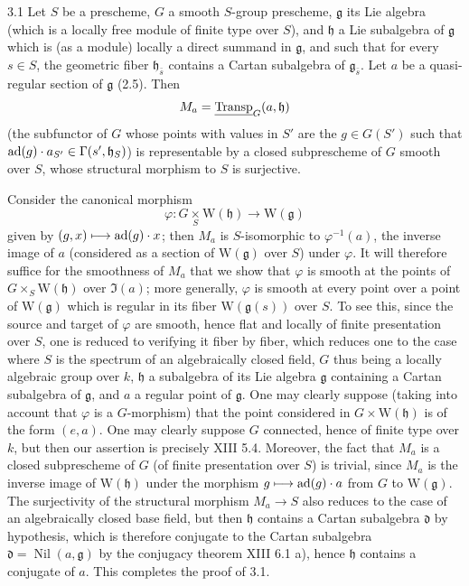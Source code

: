 \begin{theorem}{3.1}\label{XIV.3.1}
Let $S$ be a prescheme, $G$ a smooth
$S$-group prescheme, $\mathfrak g$ its
Lie algebra (which is a locally free
module of finite type over $S$), and
$\mathfrak h$ a Lie subalgebra of
$\mathfrak g$ which is (as a module)
locally a direct summand in
$\mathfrak g$, and such that for every
$s\in S$, the geometric fiber
$\mathfrak h_{\bar s}$ contains a
Cartan subalgebra of $\mathfrak g_{\bar s}$.
Let $a$ be a quasi-regular section of
$\mathfrak g$ (2.5). Then
\[
 M_a=\underline{\operatorname{Transp}}_G(a,\mathfrak h)
\]
(the subfunctor of $G$ whose points
with values in $S'$ are the
$g\in G(S')$ such that
$\operatorname{ad}(g)\cdot a_{S'}\in\Gamma(s',\mathfrak h_S)$)
is representable by a closed subprescheme
of $G$ smooth over $S$, whose structural
morphism to $S$ is surjective.
\end{theorem}
Consider the canonical morphism
\[
 \varphi:G\underset S\times\mathrm W(\mathfrak h)
 \longrightarrow\mathrm W(\mathfrak g)
\]
given by $(g,x)\longmapsto\operatorname{ad}(g)\cdot x$;
then $M_a$ is $S$-isomorphic to
$\varphi^{-1}(a)$, the inverse image
of $a$ (considered as a section of
$\mathrm W(\mathfrak g)$ over $S$)
under $\varphi$. It will therefore
suffice for the smoothness of $M_a$
that we show that $\varphi$ is smooth
at the points of $G\times_S\mathrm W(\mathfrak h)$
over $\Im(a)$; more generally,
$\varphi$ is smooth at every point
over a point of $\mathrm W(\mathfrak g)$
which is regular in its fiber
$\mathrm W(\mathfrak g(s))$ over $S$.
To see this, since the source and
target of $\varphi$ are smooth,
hence flat and locally of finite
presentation over $S$, one is
reduced to verifying it fiber by
fiber, which reduces one to the
case where $S$ is the spectrum of
an algebraically closed field,
$G$ thus being a locally algebraic
group over $k$, $\mathfrak h$ a
subalgebra of its Lie algebra
$\mathfrak g$ containing a Cartan
subalgebra of $\mathfrak g$, and
$a$ a regular point of
$\mathfrak g$. One may clearly
suppose (taking into account that
$\varphi$ is a $G$-morphism) that
the point considered in
$G\times\mathrm W(\mathfrak h)$
is of the form $(e,a)$. One may
clearly suppose $G$ connected,
hence of finite type over $k$,
but then our assertion is
precisely XIII 5.4. Moreover,
the fact that $M_a$ is a closed
subprescheme of $G$ (of finite
presentation over $S$) is trivial,
since $M_a$ is the inverse
image of $\mathrm W(\mathfrak h)$
under the morphism
$g\longmapsto\operatorname{ad}(g)\cdot a$ from $G$
to $\mathrm W(\mathfrak g)$.
The surjectivity of the
structural morphism $M_a\to S$
also reduces to the case of
an algebraically closed base
field, but then $\mathfrak h$
contains a Cartan subalgebra
$\mathfrak d$ by hypothesis,
which is therefore conjugate
to the Cartan subalgebra
$\mathfrak d=\operatorname{Nil}(a,\mathfrak g)$
by the conjugacy theorem XIII
6.1 a), hence $\mathfrak h$
contains a conjugate of $a$.
This completes the proof of 3.1.

